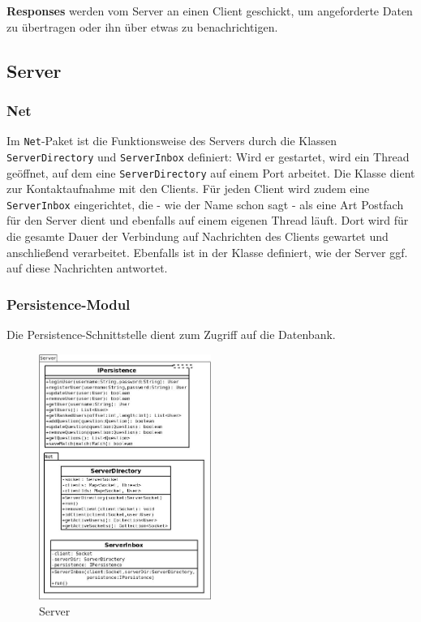 \textbf{Responses} werden vom Server an einen Client geschickt, um angeforderte Daten zu übertragen oder ihn über etwas zu benachrichtigen. 

\subsection{Server}
\subsubsection{Net}
Im \texttt{Net}-Paket ist die Funktionsweise des Servers durch die Klassen \texttt{ServerDirectory} und \texttt{ServerInbox} definiert: Wird er gestartet, wird ein Thread geöffnet, auf dem eine \texttt{ServerDirectory} auf einem Port arbeitet. Die Klasse dient zur Kontaktaufnahme mit den Clients. Für jeden Client wird zudem eine \texttt{ServerInbox} eingerichtet, die - wie der Name schon sagt - als eine Art Postfach für den Server dient und ebenfalls auf einem eigenen Thread läuft. Dort wird für die gesamte Dauer der Verbindung auf Nachrichten des Clients gewartet und anschließend verarbeitet. Ebenfalls ist in der Klasse definiert, wie der Server ggf. auf diese Nachrichten antwortet.

\newpage
\subsubsection{Persistence-Modul}
Die Persistence-Schnittstelle dient zum Zugriff auf die Datenbank.

\begin{figure}[H]
	\centering
	\begin{minipage}[t]{\textwidth}
		\includegraphics[width=0.5\textwidth]{Diagramme/server.jpeg}
		\caption{Server}
		\label{Server}
	\end{minipage}
\end{figure}

